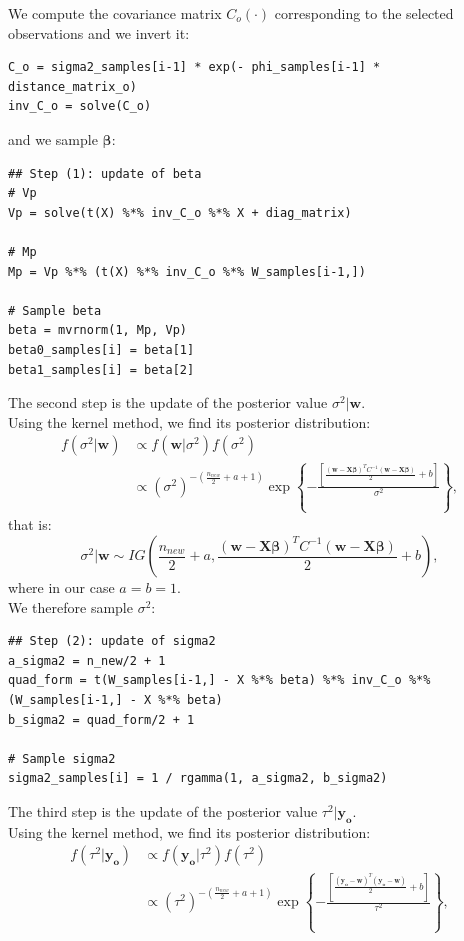 \documentclass[a4paper,12pt]{article}
\begin{document}
We compute the covariance matrix \(C_o(\cdot)\) corresponding to the selected observations and we invert it:
\begin{lstlisting}[style=R]
C_o = sigma2_samples[i-1] * exp(- phi_samples[i-1] * distance_matrix_o)
inv_C_o = solve(C_o)
\end{lstlisting}
and we sample \(\boldsymbol{\beta}\):
\begin{lstlisting}[style=R]
## Step (1): update of beta
# Vp
Vp = solve(t(X) %*% inv_C_o %*% X + diag_matrix)

# Mp
Mp = Vp %*% (t(X) %*% inv_C_o %*% W_samples[i-1,])

# Sample beta
beta = mvrnorm(1, Mp, Vp)
beta0_samples[i] = beta[1]
beta1_samples[i] = beta[2]
\end{lstlisting}
The second step is the update of the posterior value \(\sigma^2|\mathbf{w}\). \\
Using the kernel method, we find its posterior distribution:
\begin{align*}
    f(\sigma^2|\mathbf{w}) &\propto f(\mathbf{w}|\sigma^2)f(\sigma^2) \\
    &\propto (\sigma^2)^{-\left( \frac{n_{new}}{2} + a + 1 \right)} \exp{\left\{ - \frac{\left[ \frac{(\mathbf{w} - \mathbf{X} \boldsymbol{\beta})^T C^{-1} (\mathbf{w} - \mathbf{X} \boldsymbol{\beta})}{2} + b \right]}{\sigma^2} \right\}},
\end{align*}
that is:
\begin{equation*}
    \sigma^2|\mathbf{w} \sim IG\left(\frac{n_{new}}{2} + a, \frac{(\mathbf{w} - \mathbf{X} \boldsymbol{\beta})^T C^{-1} (\mathbf{w} - \mathbf{X} \boldsymbol{\beta})}{2} + b \right),
\end{equation*}
where in our case \(a = b = 1\).\\
We therefore sample \(\sigma^2\):
\begin{lstlisting}[style=R]
## Step (2): update of sigma2
a_sigma2 = n_new/2 + 1
quad_form = t(W_samples[i-1,] - X %*% beta) %*% inv_C_o %*% (W_samples[i-1,] - X %*% beta)
b_sigma2 = quad_form/2 + 1

# Sample sigma2
sigma2_samples[i] = 1 / rgamma(1, a_sigma2, b_sigma2)
\end{lstlisting}
The third step is the update of the posterior value \(\tau^2|\mathbf{y_o}\). \\
Using the kernel method, we find its posterior distribution:
\begin{align*}
    f(\tau^2|\mathbf{y_o}) &\propto f(\mathbf{y_o}|\tau^2)f(\tau^2) \\
    &\propto (\tau^2)^{-\left( \frac{n_{new}}{2} + a + 1 \right)} \exp{\left\{ - \frac{\left[ \frac{(\mathbf{y_o - \mathbf{w}})^T (\mathbf{y_o - \mathbf{w}})}{2} + b \right]}{\tau^2} \right\}},
\end{align*}
\end{document}
